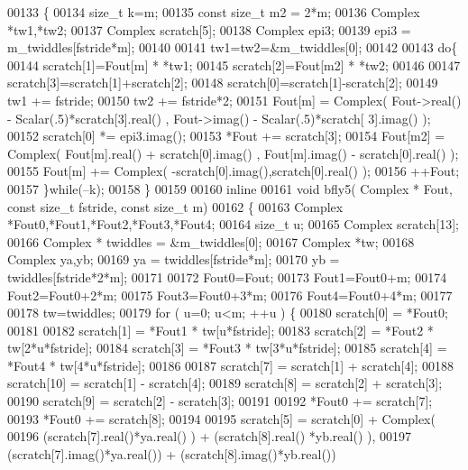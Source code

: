 \begin{DoxyCode}
00133     \{
00134       \textcolor{keywordtype}{size\_t} k=m;
00135       \textcolor{keyword}{const} \textcolor{keywordtype}{size\_t} m2 = 2*m;
00136       Complex *tw1,*tw2;
00137       Complex scratch[5];
00138       Complex epi3;
00139       epi3 = m\_twiddles[fstride*m];
00140 
00141       tw1=tw2=&m\_twiddles[0];
00142 
00143       \textcolor{keywordflow}{do}\{
00144         scratch[1]=Fout[m] * *tw1;
00145         scratch[2]=Fout[m2] * *tw2;
00146 
00147         scratch[3]=scratch[1]+scratch[2];
00148         scratch[0]=scratch[1]-scratch[2];
00149         tw1 += fstride;
00150         tw2 += fstride*2;
00151         Fout[m] = Complex( Fout->real() - Scalar(.5)*scratch[3].real() , Fout->imag() - Scalar(.5)*scratch[
      3].imag() );
00152         scratch[0] *= epi3.imag();
00153         *Fout += scratch[3];
00154         Fout[m2] = Complex(  Fout[m].real() + scratch[0].imag() , Fout[m].imag() - scratch[0].real() );
00155         Fout[m] += Complex( -scratch[0].imag(),scratch[0].real() );
00156         ++Fout;
00157       \}\textcolor{keywordflow}{while}(--k);
00158     \}
00159 
00160   \textcolor{keyword}{inline}
00161     \textcolor{keywordtype}{void} bfly5( Complex * Fout, \textcolor{keyword}{const} \textcolor{keywordtype}{size\_t} fstride, \textcolor{keyword}{const} \textcolor{keywordtype}{size\_t} m)
00162     \{
00163       Complex *Fout0,*Fout1,*Fout2,*Fout3,*Fout4;
00164       \textcolor{keywordtype}{size\_t} u;
00165       Complex scratch[13];
00166       Complex * twiddles = &m\_twiddles[0];
00167       Complex *tw;
00168       Complex ya,yb;
00169       ya = twiddles[fstride*m];
00170       yb = twiddles[fstride*2*m];
00171 
00172       Fout0=Fout;
00173       Fout1=Fout0+m;
00174       Fout2=Fout0+2*m;
00175       Fout3=Fout0+3*m;
00176       Fout4=Fout0+4*m;
00177 
00178       tw=twiddles;
00179       \textcolor{keywordflow}{for} ( u=0; u<m; ++u ) \{
00180         scratch[0] = *Fout0;
00181 
00182         scratch[1]  = *Fout1 * tw[u*fstride];
00183         scratch[2]  = *Fout2 * tw[2*u*fstride];
00184         scratch[3]  = *Fout3 * tw[3*u*fstride];
00185         scratch[4]  = *Fout4 * tw[4*u*fstride];
00186 
00187         scratch[7] = scratch[1] + scratch[4];
00188         scratch[10] = scratch[1] - scratch[4];
00189         scratch[8] = scratch[2] + scratch[3];
00190         scratch[9] = scratch[2] - scratch[3];
00191 
00192         *Fout0 +=  scratch[7];
00193         *Fout0 +=  scratch[8];
00194 
00195         scratch[5] = scratch[0] + Complex(
00196             (scratch[7].real()*ya.real() ) + (scratch[8].real() *yb.real() ),
00197             (scratch[7].imag()*ya.real()) + (scratch[8].imag()*yb.real())

\end{DoxyCode}
